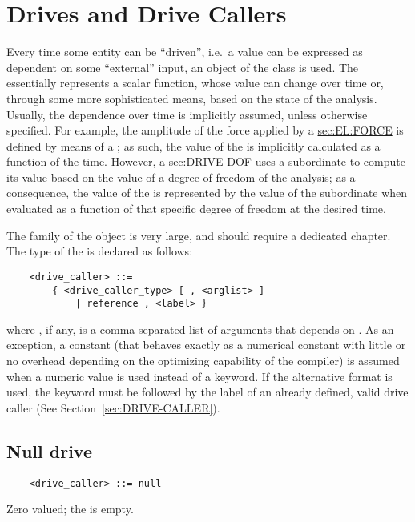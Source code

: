 \section{Drives and Drive Callers}\label{sec:DRIVE}
Every time some entity can be ``driven'', i.e.\ a value can be
expressed as dependent on some ``external'' input, an object of the class 
 is used. 
The  essentially represents a scalar function, whose
value can change over time or, through some more sophisticated
means, based on the state of the analysis.
Usually, the dependence over time is implicitly assumed, unless
otherwise specified.
For example, the amplitude of the force applied by a 
\hyperref{\kw{force} element}{\kw{force} element (see Section~}{)}{sec:EL:FORCE}
is defined by means of a ; as such, the value of the  
is implicitly calculated as a function of the time.
However, a 
\hyperref{\kw{dof drive}}{\kw{dof drive} (see Section~}{)}{sec:DRIVE-DOF}
uses a subordinate  to compute its value based on the value
of a degree of freedom of the analysis; as a consequence,
the value of the  is represented by the
value of the subordinate  when evaluated as a function
of that specific degree of freedom at the desired time.

\noindent
The family of the  object is very large, 
and should require a dedicated chapter.
The type of the  is declared as follows:
\begin{verbatim}
    <drive_caller> ::=
        { <drive_caller_type> [ , <arglist> ]
            | reference , <label> }
\end{verbatim}    
where , if any, is a comma-separated list of arguments
that depends on .
As an exception, a constant  (that behaves exactly as a
numerical constant with little or no overhead depending on the optimizing
capability of the compiler) is assumed when a numeric value is used instead
of a keyword.
If the alternative format is used, the keyword  
must be followed by the label of an already defined, valid drive caller
(See Section~\ref{sec:DRIVE-CALLER}).

\subsection{Null drive}
\begin{verbatim}
    <drive_caller> ::= null
\end{verbatim}
Zero valued; the  is empty.

